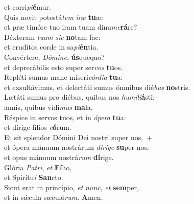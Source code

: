 \evenverse et corri\textit{pi}\textbf{é}mur.\\
\oddverse Quis novit potestá\textit{tem} \textit{i}\textit{ræ} \textbf{tu}æ:~\*\\
\oddverse et præ timóre tuo iram tuam dinu\textit{me}\textbf{rá}re?\\
\evenverse Déxteram \textit{tu}\textit{am} \textit{sic} \textbf{no}tam fac:~\*\\
\evenverse et erudítos corde in sa\textit{pi}\textbf{én}tia.\\
\oddverse Convértere, \textit{Dó}\textit{mi}\textit{ne}, \textbf{ús}quequo?~\*\\
\oddverse et deprecábilis esto super ser\textit{vos} \textbf{tu}os.\\
\evenverse Repléti sumus mane miseri\textit{cór}\textit{di}\textit{a} \textbf{tu}a:~\*\\
\evenverse et exsultávimus, et delectáti sumus ómnibus dié\textit{bus} \textbf{no}stris.\\
\oddverse Lætáti sumus pro diébus, quibus nos \textit{hu}\textit{mi}\textit{li}\textbf{á}sti:~\*\\
\oddverse annis, quibus vídi\textit{mus} \textbf{ma}la.\\
\evenverse Réspice in servos tuos, et in \textit{ó}\textit{pe}\textit{ra} \textbf{tu}a:~\*\\
\evenverse et dírige fílios \textit{e}\textbf{ó}rum.\\
\oddverse Et sit splendor Dómini Dei nostri super nos,~+\\
\oddverse  et ópera mánuum nostrárum \textit{dí}\textit{ri}\textit{ge} \textbf{su}per nos:~\*\\
\oddverse et opus mánuum nostrá\textit{rum} \textbf{dí}rige.\\
\evenverse Glória \textit{Pa}\textit{tri}, \textit{et} \textbf{Fí}lio,~\*\\
\evenverse et Spirítu\textit{i} \textbf{San}cto.\\
\oddverse Sicut erat in princípio, \textit{et} \textit{nunc}, \textit{et} \textbf{sem}per,~\*\\
\oddverse et in sǽcula sæculó\textit{rum}. \textbf{A}men.\\
